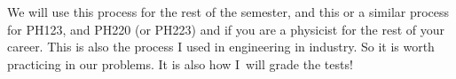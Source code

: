 \documentclass[]{Book}
\begin{document}
We will use this process for the rest of the semester, and this or a similar
process for PH123, and PH220 (or PH223) and if you are a physicist for the
rest of your career. This is also the process I used in engineering in
industry. So it is worth practicing in our problems. It is also how I\ will
grade the tests!
 

 \appendix


 
 

 
  \renewcommand{\baselinestretch}{1} \small \normalsize
  \printindex
\end{document}
